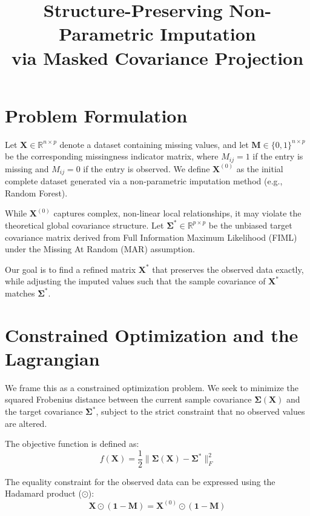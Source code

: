 \documentclass[11pt]{article}
\title{Structure-Preserving Non-Parametric Imputation\\via Masked Covariance Projection}
\author{}
\date{}
\begin{document}
\raggedbottom

\maketitle

\section{Problem Formulation}
Let $\bm{X} \in \mathbb{R}^{n \times p}$ denote a dataset containing missing values, and let $\bm{M} \in \{0, 1\}^{n \times p}$ be the corresponding missingness indicator matrix, where $M_{ij} = 1$ if the entry is missing and $M_{ij} = 0$ if the entry is observed. We define $\bm{X}^{(0)}$ as the initial complete dataset generated via a non-parametric imputation method (e.g., Random Forest). 

While $\bm{X}^{(0)}$ captures complex, non-linear local relationships, it may violate the theoretical global covariance structure. Let $\bm{\Sigma}^* \in \mathbb{R}^{p \times p}$ be the unbiased target covariance matrix derived from Full Information Maximum Likelihood (FIML) under the Missing At Random (MAR) assumption. 

Our goal is to find a refined matrix $\bm{X}^*$ that preserves the observed data exactly, while adjusting the imputed values such that the sample covariance of $\bm{X}^*$ matches $\bm{\Sigma}^*$.

\section{Constrained Optimization and the Lagrangian}
We frame this as a constrained optimization problem. We seek to minimize the squared Frobenius distance between the current sample covariance $\bm{\Sigma}(\bm{X})$ and the target covariance $\bm{\Sigma}^*$, subject to the strict constraint that no observed values are altered.

The objective function is defined as:
\begin{equation}
    f(\bm{X}) = \frac{1}{2} \big\| \bm{\Sigma}(\bm{X}) - \bm{\Sigma}^* \big\|_F^2
\end{equation}

The equality constraint for the observed data can be expressed using the Hadamard product ($\odot$):
\begin{equation}
    \bm{X} \odot (\bm{1} - \bm{M}) = \bm{X}^{(0)} \odot (\bm{1} - \bm{M})
\end{equation}
\end{document}
